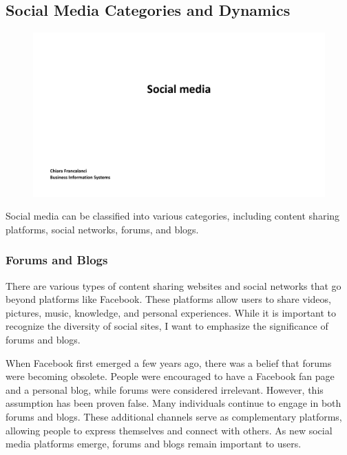 \subsection{Social Media Categories and
  Dynamics}\label{social-media-categories-and-dynamics}

\begin{figure}[!h]
  \centering
  \includegraphics[page=5, trim = 1.5cm 5cm 3cm 4cm, clip, width=\imagewidth]{images/04 - Social_Media.pdf}
\end{figure}

Social media can be classified into various categories, including
content sharing platforms, social networks, forums, and blogs.

\subsubsection{Forums and Blogs}\label{forums-and-blogs}

There are various types of content sharing websites and social networks
that go beyond platforms like Facebook. These platforms allow users to
share videos, pictures, music, knowledge, and personal experiences.
While it is important to recognize the diversity of social sites, I want
to emphasize the significance of forums and blogs.

When Facebook first emerged a few years ago, there was a belief that
forums were becoming obsolete. People were encouraged to have a Facebook
fan page and a personal blog, while forums were considered irrelevant.
However, this assumption has been proven false. Many individuals
continue to engage in both forums and blogs. These additional channels
serve as complementary platforms, allowing people to express themselves
and connect with others. As new social media platforms emerge, forums
and blogs remain important to users.

